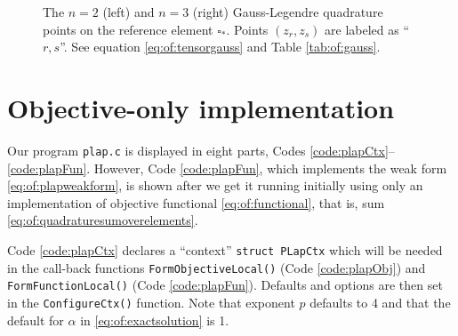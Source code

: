 \newcommand{\gausssanspts}{
  \draw[->,very thin] (-1.2,0.0) -- (1.2,0.0) node[below] {\small $\xi$};
  \draw[->,very thin] (0.0,-1.2) -- (0.0,1.2) node[left] {\small $\eta$};
  \draw[line width=1.5pt] (1.0,1.0) -- (-1.0,1.0) -- (-1.0,-1.0) -- (1.0,-1.0) -- cycle;
}

\begin{figure}
\qquad\qquad
{}
\caption{The $n=2$ (left) and $n=3$ (right) Gauss-Legendre quadrature points on the reference element $\square_\ast$.  Points $(z_r,z_s)$ are labeled as ``$r,s$''.  See equation \eqref{eq:of:tensorgauss} and Table \ref{tab:of:gauss}.}
\label{fig:of:gausstwod}
\end{figure}


\section{Objective-only implementation}

Our program \texttt{plap.c} is displayed in eight parts, Codes \ref{code:plapCtx}--\ref{code:plapFun}.  However, Code \ref{code:plapFun}, which implements the weak form \eqref{eq:of:plapweakform}, is shown after we get it running initially using only an implementation of objective functional \eqref{eq:of:functional}, that is, sum \eqref{eq:of:quadraturesumoverelements}.


Code \ref{code:plapCtx} declares a ``context'' \texttt{struct PLapCtx} which will be needed in the call-back functions \texttt{FormObjectiveLocal()} (Code \ref{code:plapObj}) and \texttt{FormFunctionLocal()} (Code \ref{code:plapFun}).  Defaults and \PETSc options are then set in the \texttt{ConfigureCtx()} function.  Note that exponent $p$ defaults to 4 and that the default for $\alpha$ in \eqref{eq:of:exactsolution} is 1.

